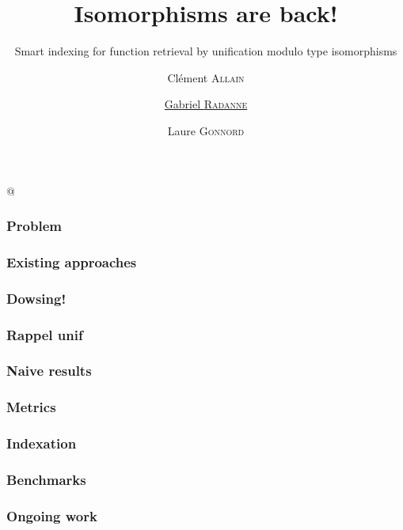 \documentclass[aspectratio=169,dvipsnames,svgnames,10pt]{beamer}
\title{Isomorphisms are back!}
\subtitle{Smart indexing for function retrieval by unification modulo type isomorphisms}
\author{
  Clément \textsc{Allain}
  \and
  \underline{Gabriel \textsc{Radanne}}
  \and
  Laure \textsc{Gonnord} \\
}
\date{}
\begin{document}
\lstMakeShortInline[keepspaces,basicstyle=\small\ttfamily]@

\begin{frame}
  \titlepage
\end{frame}

\begin{frame}
  \frametitle{Problem}
  
\end{frame}

\begin{frame}
  \frametitle{Existing approaches}
  
\end{frame}

\begin{frame}
  \frametitle{Dowsing!}
  
\end{frame}

\begin{frame}
  \frametitle{Rappel unif}
  
\end{frame}

\begin{frame}
  \frametitle{Naive results}
  
\end{frame}

\begin{frame}
  \frametitle{Metrics}
  
\end{frame}

\begin{frame}
  \frametitle{Indexation}
  
\end{frame}

\begin{frame}
  \frametitle{Benchmarks}
  
\end{frame}


\begin{frame}
  \frametitle{Ongoing work}
  
\end{frame}
\end{document}
